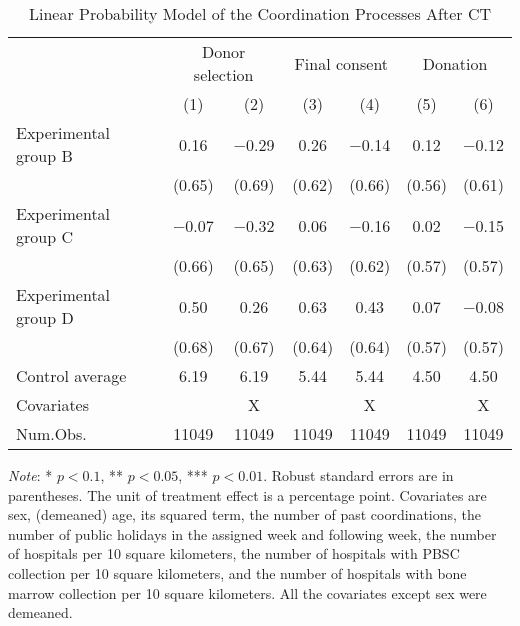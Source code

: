 \documentclass[12pt, a4paper]{article}
\begin{document}
\begin{table}

\caption{\label{tab:lm-coordinate}Linear Probability Model of the Coordination Processes After CT}
\centering
\fontsize{8}{10}\selectfont
\begin{threeparttable}
\begin{tabular}[t]{lcccccc}
\toprule
\multicolumn{1}{c}{ } & \multicolumn{2}{c}{Donor selection} & \multicolumn{2}{c}{Final consent} & \multicolumn{2}{c}{Donation} \\
\cmidrule(l{3pt}r{3pt}){2-3} \cmidrule(l{3pt}r{3pt}){4-5} \cmidrule(l{3pt}r{3pt}){6-7}
  & (1) & (2) & (3) & (4) & (5) & (6)\\
\midrule
Experimental group B & \num{0.16} & \num{-0.29} & \num{0.26} & \num{-0.14} & \num{0.12} & \num{-0.12}\\
 & (\num{0.65}) & (\num{0.69}) & (\num{0.62}) & (\num{0.66}) & (\num{0.56}) & (\num{0.61})\\
Experimental group C & \num{-0.07} & \num{-0.32} & \num{0.06} & \num{-0.16} & \num{0.02} & \num{-0.15}\\
 & (\num{0.66}) & (\num{0.65}) & (\num{0.63}) & (\num{0.62}) & (\num{0.57}) & (\num{0.57})\\
Experimental group D & \num{0.50} & \num{0.26} & \num{0.63} & \num{0.43} & \num{0.07} & \num{-0.08}\\
 & (\num{0.68}) & (\num{0.67}) & (\num{0.64}) & (\num{0.64}) & (\num{0.57}) & (\num{0.57})\\
\midrule
Control average & 6.19 & 6.19 & 5.44 & 5.44 & 4.50 & 4.50\\
Covariates &  & X &  & X &  & X\\
Num.Obs. & \num{11049} & \num{11049} & \num{11049} & \num{11049} & \num{11049} & \num{11049}\\
\bottomrule
\end{tabular}
\begin{tablenotes}
\item \emph{Note}: * $p < 0.1$, ** $p < 0.05$, *** $p < 0.01$. Robust standard errors are in parentheses. The unit of treatment effect is a percentage point. Covariates are sex, (demeaned) age, its squared term, the number of past coordinations, the number of public holidays in the assigned week and following week, the number of hospitals per 10 square kilometers, the number of hospitals with PBSC collection per 10 square kilometers, and the number of hospitals with bone marrow collection per 10 square kilometers. All the covariates except sex were demeaned.
\end{tablenotes}
\end{threeparttable}
\end{table}
\end{document}
